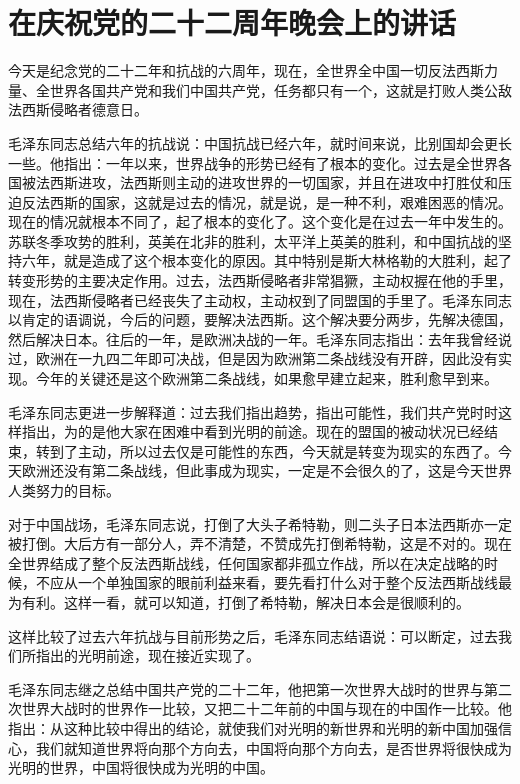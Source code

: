 \section[在庆祝党的二十二周年晚会上的讲话（一九四三年七月三日）]{在庆祝党的二十二周年晚会上的讲话}


今天是纪念党的二十二年和抗战的六周年，现在，全世界全中国一切反法西斯力量、全世界各国共产党和我们中国共产党，任务都只有一个，这就是打败人类公敌法西斯侵略者德意日。

毛泽东同志总结六年的抗战说：中国抗战已经六年，就时间来说，比别国却会更长一些。他指出：一年以来，世界战争的形势已经有了根本的变化。过去是全世界各国被法西斯进攻，法西斯则主动的进攻世界的一切国家，并且在进攻中打胜仗和压迫反法西斯的国家，这就是过去的情况，就是说，是一种不利，艰难困恶的情况。现在的情况就根本不同了，起了根本的变化了。这个变化是在过去一年中发生的。苏联冬季攻势的胜利，英美在北非的胜利，太平洋上英美的胜利，和中国抗战的坚持六年，就是造成了这个根本变化的原因。其中特别是斯大林格勒的大胜利，起了转变形势的主要决定作用。过去，法西斯侵略者非常猖獗，主动权握在他的手里，现在，法西斯侵略者已经丧失了主动权，主动权到了同盟国的手里了。毛泽东同志以肯定的语调说，今后的问题，要解决法西斯。这个解决要分两步，先解决德国，然后解决日本。往后的一年，是欧洲决战的一年。毛泽东同志指出：去年我曾经说过，欧洲在一九四二年即可决战，但是因为欧洲第二条战线没有开辟，因此没有实现。今年的关键还是这个欧洲第二条战线，如果愈早建立起来，胜利愈早到来。

毛泽东同志更进一步解释道：过去我们指出趋势，指出可能性，我们共产党时时这样指出，为的是他大家在困难中看到光明的前途。现在的盟国的被动状况已经结束，转到了主动，所以过去仅是可能性的东西，今天就是转变为现实的东西了。今天欧洲还没有第二条战线，但此事成为现实，一定是不会很久的了，这是今天世界人类努力的目标。

对于中国战场，毛泽东同志说，打倒了大头子希特勒，则二头子日本法西斯亦一定被打倒。大后方有一部分人，弄不清楚，不赞成先打倒希特勒，这是不对的。现在全世界结成了整个反法西斯战线，任何国家都非孤立作战，所以在决定战略的时候，不应从一个单独国家的眼前利益来看，要先看打什么对于整个反法西斯战线最为有利。这样一看，就可以知道，打倒了希特勒，解决日本会是很顺利的。

这样比较了过去六年抗战与目前形势之后，毛泽东同志结语说：可以断定，过去我们所指出的光明前途，现在接近实现了。

毛泽东同志继之总结中国共产党的二十二年，他把第一次世界大战时的世界与第二次世界大战时的世界作一比较，又把二十二年前的中国与现在的中国作一比较。他指出：从这种比较中得出的结论，就使我们对光明的新世界和光明的新中国加强信心，我们就知道世界将向那个方向去，中国将向那个方向去，是否世界将很快成为光明的世界，中国将很快成为光明的中国。

